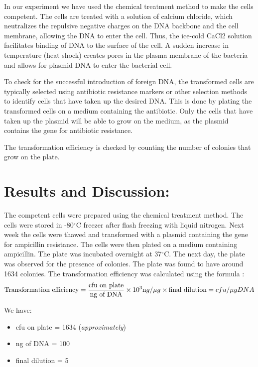 \documentclass{report}
\begin{document}
In our experiment we have used the chemical treatment method to make the cells competent.
The cells are treated with a solution of calcium chloride, which neutralizes the repulsive negative
charges on the DNA backbone and the cell membrane, allowing the DNA to enter the cell. Thus,
the ice-cold CaCl2 solution facilitates binding of DNA to the surface of the cell. A sudden increase
in temperature (heat shock) creates pores in the plasma membrane of the bacteria and allows for
plasmid DNA to enter the bacterial cell. 

To check for the successful introduction of foreign DNA, the transformed cells are typically selected
using antibiotic resistance markers or other selection methods to identify cells that have taken up the desired DNA.
This is done by plating the transformed cells on a medium containing the antibiotic.
Only the cells that have taken up the plasmid will be able to grow on the medium, as the plasmid contains the gene for antibiotic resistance.

The transformation efficiency is checked by counting the number of colonies that grow on the plate.

\section*{Results and Discussion:}
The competent cells were prepared using the chemical treatment method. The cells were stored in -80$^{\circ}$C freezer
after flash freezing with liquid nitrogen. Next week the cells were thawed and transformed with a plasmid containing the gene for ampicillin resistance.
The cells were then plated on a medium containing ampicillin. The plate was incubated overnight at 37$^{\circ}$C.
The next day, the plate was observed for the presence of colonies. The plate was found to have around 1634 colonies.
The transformation efficiency was calculated using the formula :
\begin{equation}
  \text{Transformation efficiency} = \frac{\text{cfu on plate}}{\text{ng of DNA}} \times {10^3}{\text ng/\mu g} \times {\text{final dilution}}   = cfu / \mu g   DNA
\end{equation}

\vspace{6cm}

We have:
\begin{itemize}
  \item cfu on plate = 1634 (\textit{approximately})
  \item ng of DNA = 100
  \item final dilution = 5
\end{itemize}
\end{document}
